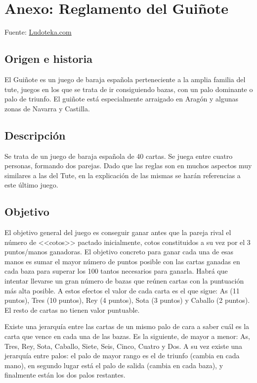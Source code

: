 \documentclass{article}
\begin{document}

\appendix
\section{Anexo: Reglamento del Guiñote}
Fuente: \href{https://www.ludoteka.com/clasika/guinote.html}{Ludoteka.com}

\subsection*{Origen e historia}
El Guiñote es un juego de baraja española perteneciente a la amplia familia del tute, juegos en los que se trata de ir consiguiendo bazas, con un palo dominante o palo de triunfo. El guiñote está especialmente arraigado en Aragón y algunas zonas de Navarra y Castilla.

\subsection*{Descripción}
Se trata de un juego de baraja española de 40 cartas. Se juega entre cuatro personas, formando dos parejas. Dado que las reglas son en muchos aspectos muy similares a las del Tute, en la explicación de las mismas se harán referencias a este último juego.

\subsection*{Objetivo}
El objetivo general del juego es conseguir ganar antes que la pareja rival el número de <<cotos>> pactado inicialmente, cotos constituidos a su vez por el 3 puntos/manos ganadoras. El objetivo concreto para ganar cada una de esas manos es sumar el mayor número de puntos posible con las cartas ganadas en cada baza para superar los 100 tantos necesarios para ganarla. Habrá que intentar llevarse un gran número de bazas que reúnen cartas con la puntuación más alta posible. A estos efectos el valor de cada carta es el que sigue: As (11 puntos), Tres (10 puntos), Rey (4 puntos), Sota (3 puntos) y Caballo (2 puntos). El resto de cartas no tienen valor puntuable.

Existe una jerarquía entre las cartas de un mismo palo de cara a saber cuál es la carta que vence en cada una de las bazas. Es la siguiente, de mayor a menor: As, Tres, Rey, Sota, Caballo, Siete, Seis, Cinco, Cuatro y Dos. A su vez existe una jerarquía entre palos: el palo de mayor rango es el de triunfo (cambia en cada mano), en segundo lugar está el palo de salida (cambia en cada baza), y finalmente están los dos palos restantes.
\end{document}
